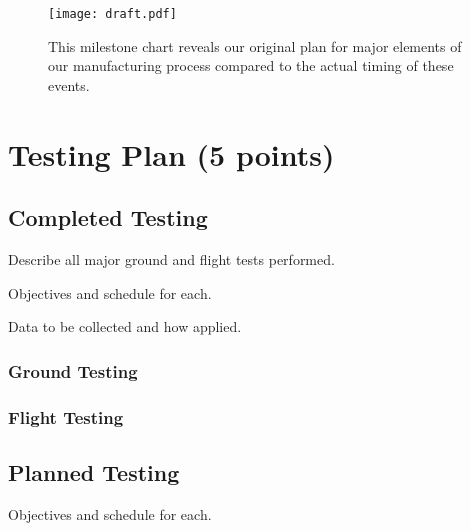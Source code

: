 \documentclass[report]{byu-aero}
\begin{document}
\begin{figure}[h!]
	\centering
	\texttt{[image: draft.pdf]}
	\caption{This milestone chart reveals our original plan for major elements of our manufacturing process compared to the actual timing of these events.}
	\label{fig:plannedvsactualtimingmanufacturing}
\end{figure}


\section{Testing Plan (5 points)}
\label{sec:TestingPlan}

\subsection{Completed Testing}
\label{ssec:completedtesting}

Describe all major ground and flight tests performed.

Objectives and schedule for each.

Data to be collected and how applied.

\subsubsection{Ground Testing}
\label{sssec:groundtesting}

\subsubsection{Flight Testing}
\label{sssec:flighttesting}

\subsection{Planned Testing}
\label{ssec:plannedtesting}

Objectives and schedule for each.
\end{document}
